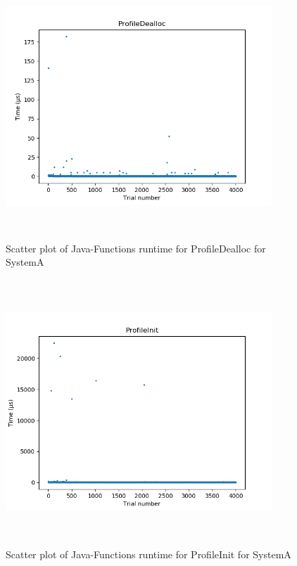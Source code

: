 \begin{figure}[H]
	\centering
	\includegraphics[width=10cm,height=10cm,keepaspectratio]{RuntimeResults_SystemA/JavaFunctions/ProfileDealloc_scatter.png}
	\caption{Scatter plot of Java-Functions runtime for ProfileDealloc for SystemA}
	\label{fig:Java-Functions|ProfileDealloc|SystemA}
\end{figure}

\begin{figure}[H]
	\centering
	\includegraphics[width=10cm,height=10cm,keepaspectratio]{RuntimeResults_SystemA/JavaFunctions/ProfileInit_scatter.png}
	\caption{Scatter plot of Java-Functions runtime for ProfileInit for SystemA}
	\label{fig:Java-Functions|ProfileInit|SystemA}
\end{figure}


